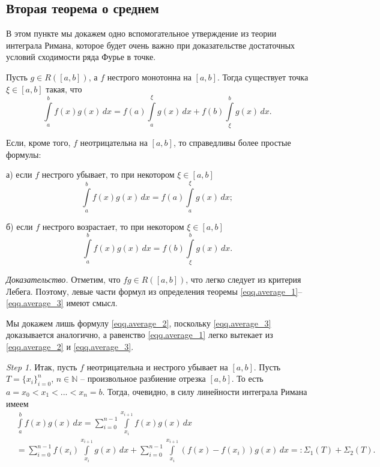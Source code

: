 \subsection{Вторая теорема о среднем}

В этом пункте мы докажем одно вспомогательное утверждение из теории интеграла Римана, которое 
будет очень важно при доказательстве достаточных условий сходимости ряда Фурье в точке.

\begin{theorem}
\label{Th.average}
Пусть $g \in R([a,b])$, а $f$ нестрого монотонна на $[a,b]$. Тогда существует точка $\xi \in [a,b]$ такая, что
\begin{equation}
\label{eqq.average_1}
\int\limits_{a}^{b}f(x)g(x)\,dx = f(a)\int\limits_{a}^{\xi}g(x)\,dx + f(b)\int\limits_{\xi}^{b}g(x)\,dx.
 \end{equation}

Если, кроме того, $f$ неотрицательна на $[a,b]$, то справедливы более простые формулы:

а) если $f$ нестрого убывает, то при некотором $\xi \in [a,b]$
\begin{equation}
\label{eqq.average_2}
\int\limits_{a}^{b}f(x)g(x)\,dx = f(a)\int\limits_{a}^{\xi}g(x)\,dx;
\end{equation}
 
б) если $f$ нестрого возрастает, то при некотором $\xi \in [a,b]$
\begin{equation}
\label{eqq.average_3}
\int\limits_{a}^{b}f(x)g(x)\,dx = f(b)\int\limits_{\xi}^{b}g(x)\,dx.
\end{equation}

\end{theorem}

\textit{Доказательство.} Отметим, что $fg \in R([a,b])$, что легко следует из критерия Лебега. Поэтому, левые части формул из определения теоремы \eqref{eqq.average_1}--\eqref{eqq.average_3} имеют смысл.

Мы докажем лишь формулу \eqref{eqq.average_2}, поскольку \eqref{eqq.average_3} доказывается аналогично, а равенство \eqref{eqq.average_1} легко 
вытекает из \eqref{eqq.average_2} и \eqref{eqq.average_3}.

\textit{Step 1.}
Итак, пусть $f$ неотрицательна и нестрого убывает на $[a,b]$. Пусть $T=\{x_{i}\}_{i=0}^{n}$, $n \in \mathbb{N}$ -- произвольное разбиение отрезка $[a,b]$. То есть
$a=x_{0} < x_{1} < ... < x_{n} =b$. Тогда, очевидно, в силу линейности интеграла Римана имеем
\begin{equation}
\begin{split}
\label{eqq.13}
&\int\limits_{a}^{b}f(x)g(x)\,dx = \sum\limits_{i=0}^{n-1}\int\limits_{x_{i}}^{x_{i+1}}f(x)g(x)\,dx\\
&= \sum\limits_{i=0}^{n-1}f(x_{i})\int\limits_{x_{i}}^{x_{i+1}}g(x)\,dx
+\sum\limits_{i=0}^{n-1}\int\limits_{x_{i}}^{x_{i+1}}(f(x)-f(x_{i}))g(x)\,dx =:\Sigma_{1}(T)+\Sigma_{2}(T).
\end{split}
\end{equation}


